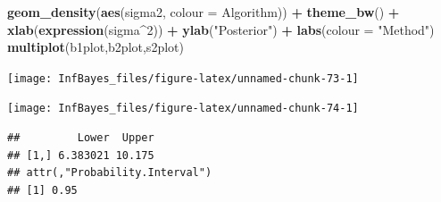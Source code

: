 \documentclass[
]{book}
\newenvironment{Shaded}{\begin{snugshade}}{\end{snugshade}}
\newcommand{\DataTypeTok}[1]{\textcolor[rgb]{0.13,0.29,0.53}{#1}}
\newcommand{\DecValTok}[1]{\textcolor[rgb]{0.00,0.00,0.81}{#1}}
\newcommand{\KeywordTok}[1]{\textcolor[rgb]{0.13,0.29,0.53}{\textbf{#1}}}
\newcommand{\NormalTok}[1]{#1}
\newcommand{\OperatorTok}[1]{\textcolor[rgb]{0.81,0.36,0.00}{\textbf{#1}}}
\newcommand{\OtherTok}[1]{\textcolor[rgb]{0.56,0.35,0.01}{#1}}
\newcommand{\StringTok}[1]{\textcolor[rgb]{0.31,0.60,0.02}{#1}}
\begin{document}
\begin{Shaded}
\begin{Highlighting}[]
\StringTok{  }\KeywordTok{geom_density}\NormalTok{(}\KeywordTok{aes}\NormalTok{(sigma2, }\DataTypeTok{colour =}\NormalTok{ Algorithm)) }\OperatorTok{+}\StringTok{ }\KeywordTok{theme_bw}\NormalTok{() }\OperatorTok{+}
\StringTok{  }\KeywordTok{xlab}\NormalTok{(}\KeywordTok{expression}\NormalTok{(sigma}\OperatorTok{^}\DecValTok{2}\NormalTok{)) }\OperatorTok{+}\StringTok{ }\KeywordTok{ylab}\NormalTok{(}\StringTok{"Posterior"}\NormalTok{) }\OperatorTok{+}\StringTok{ }\KeywordTok{labs}\NormalTok{(}\DataTypeTok{colour =} \StringTok{"Method"}\NormalTok{)}
\KeywordTok{multiplot}\NormalTok{(b1plot,b2plot,s2plot)}
\end{Highlighting}
\end{Shaded}

\begin{center}\texttt{[image: InfBayes\_files/figure-latex/unnamed-chunk-73-1]} \end{center}

\begin{Shaded}
\end{Shaded}

\begin{center}\texttt{[image: InfBayes\_files/figure-latex/unnamed-chunk-74-1]} \end{center}

\begin{verbatim}
##         Lower  Upper
## [1,] 6.383021 10.175
## attr(,"Probability.Interval")
## [1] 0.95
\end{verbatim}
\end{document}
